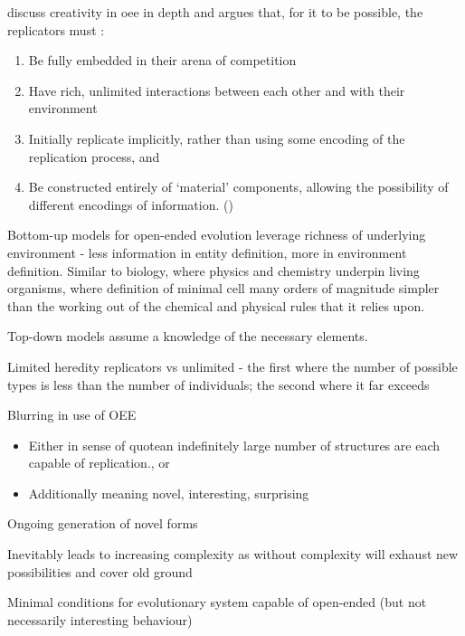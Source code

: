 \Textcite{Taylor2001,Taylor:1999sc} discuss creativity in \gls{oee} in depth and argues that, for it to be possible, the replicators must \parencite{Hutton2004}:

\begin{enumerate}[label=\roman*] 
	\item Be fully embedded in their arena of competition 
	\item Have rich, unlimited interactions between each other and with their environment 
	\item Initially replicate implicitly, rather than using some encoding of the replication process, and 
	\item Be constructed entirely of `material' components, allowing the possibility of different encodings of information. ()
\end{enumerate}

Bottom-up models for open-ended evolution leverage richness of underlying environment - less information in entity definition, more in environment definition. Similar to biology, where physics and chemistry underpin living organisms, where definition of minimal cell many orders of magnitude simpler than the working out of the chemical and physical rules that it relies upon.

Top-down models assume a knowledge of the necessary elements.

Limited heredity replicators vs unlimited - the first where the number of possible types is less than the number of individuals; the second where it far exceeds\cite{Szathmary:2006ty}

Blurring in use of OEE

\begin{itemize}
	\item Either in sense of quote{an indefinitely large number of structures are each capable of replication.}{\autocite{MaynardSmith1999}}, or
	\item Additionally meaning novel, interesting, surprising
\end{itemize}

Ongoing generation of novel forms

Inevitably leads to increasing complexity as without complexity will exhaust new possibilities and cover old ground


Minimal conditions for evolutionary system capable of open-ended (but not necessarily interesting behaviour)

